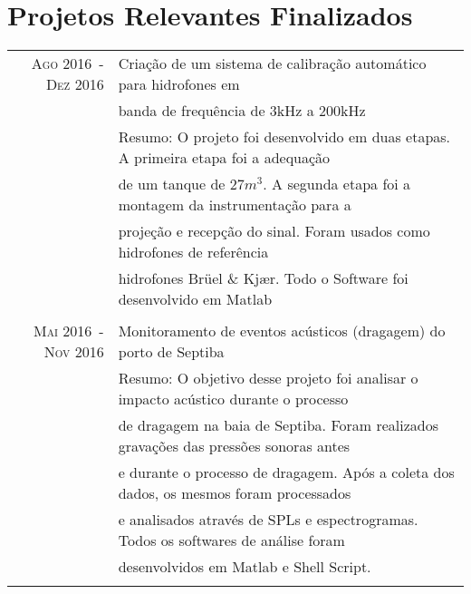 \documentclass[a4paper,10pt]{article}
\begin{document}
\section{Projetos Relevantes Finalizados}
\begin{tabular}{rl}

    \textsc{Ago 2016~-~Dez 2016}    & Criação de um sistema de calibração automático para hidrofones em \\
                                    & banda de frequência de 3kHz a 200kHz \\
                                    &\footnotesize{Resumo: O projeto foi desenvolvido em duas etapas. A primeira etapa foi a adequação}\\
                                    &\footnotesize{de um tanque de $27m^3$. A segunda etapa foi a montagem da instrumentação para a}\\
                                    &\footnotesize{projeção e recepção do sinal. Foram usados como hidrofones de referência}\\
                                    &\footnotesize{hidrofones Brüel \& Kjær. Todo o Software foi desenvolvido em Matlab} \\
                                    &\\

    \textsc{Mai 2016~-~Nov 2016}    & Monitoramento de eventos acústicos (dragagem) do porto de Septiba\\
                                    &\footnotesize{Resumo: O objetivo desse projeto foi analisar o impacto acústico durante o processo}\\
                                    &\footnotesize{de dragagem na baia de Septiba. Foram realizados gravações das pressões sonoras antes}\\
                                    &\footnotesize{e durante o processo de dragagem. Após a coleta dos dados, os mesmos foram processados}\\ 
                                    &\footnotesize{e analisados através de SPLs e espectrogramas. Todos os softwares de análise foram }\\
                                    &\footnotesize{desenvolvidos em Matlab e Shell Script.} \\
                                    &\\


\end{tabular}

\end{document}
